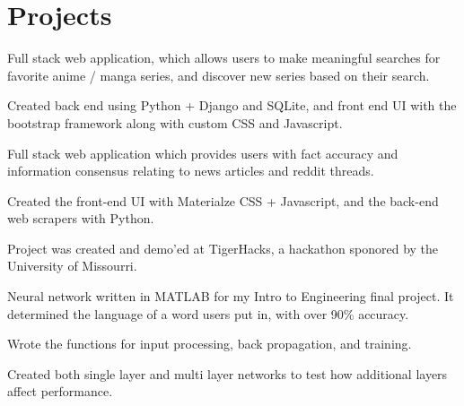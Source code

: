 \documentclass[]{yoshi}
\begin{document}
\hfill
\begin{minipage}[t]{0.65\textwidth}


\section{Projects}

\vspace{\topsep} %
\begin{tightemize}\item Full stack web application, which allows users to make meaningful searches for favorite anime / manga series, and discover new series based on their search.
\item Created back end using Python + Django and SQLite, and front end UI with the bootstrap framework along with custom CSS and Javascript.
\end{tightemize}
\sectionsep

\begin{tightemize}
\item Full stack web application which provides users with fact accuracy and information consensus relating to news articles and reddit threads. \item Created the front-end UI with Materialze CSS + Javascript, and the back-end web scrapers with Python. \item Project was created and demo'ed at TigerHacks, a hackathon sponored by the University of Missourri. \end{tightemize}
\sectionsep

\begin{tightemize}
\item Neural network written in MATLAB for my Intro to Engineering final project. It determined the language of a word users put in, with over 90\% accuracy.  \item Wrote the functions for input processing, back propagation, and training. \item Created both single layer and multi layer networks to test how additional layers affect performance. \end{tightemize}
\sectionsep


\end{minipage}
\end{document}
